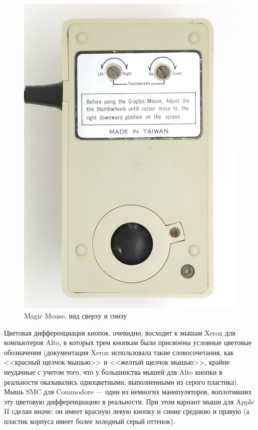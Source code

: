 \documentclass[11pt, a4paper]{article}
\begin{document}
\begin{figure}[h]
    \includegraphics[scale=0.71]{1985_smc_contriver_magic_mouse/bottom_30.jpg}
    \caption{Magic Mouse, вид сверху и снизу}
    \label{fig:MagicMouseTopAndBottom}
\end{figure}

Цветовая дифференциация кнопок, очевидно, восходит к мышам Xerox для компьютеров Alto, в которых трем кнопкам были присвоены условные цветовые обозначения (документация Xerox использовала такие словосочетания, как <<красный щелчок мышью>> и <<желтый щелчок мышью>>, крайне неудачные с учетом того, что у большинства мышей для Alto кнопки в реальности оказывались одноцветными, выполненными из серого пластика). Мышь SMC для Commodore --- один из немногих манипуляторов, воплотивших эту цветовую дифференциацию в реальности. При этом вариант мыши для Apple II сделан иначе: он имеет красную левую кнопку и синие среднюю и правую (а пластик корпуса имеет более холодный серый оттенок).
\end{document}
